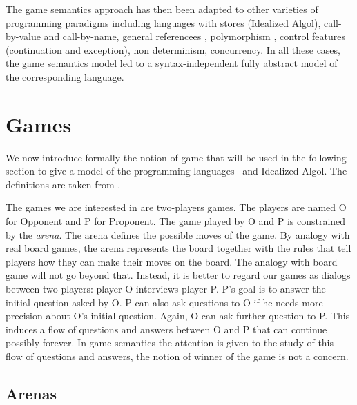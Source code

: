 The game semantics approach has then been adapted to other varieties
of programming paradigms including languages with stores (Idealized
Algol), call-by-value \citep{honda99gametheoretic,
abramsky98callbyvalue} and call-by-name, general referencees
\citep{DBLP:conf/lics/AbramskyHM98}, polymorphism
\citep{DBLP:journals/apal/AbramskyJ05}, control features
(continuation and exception), non determinism, concurrency. In all
these cases, the game semantics model led to a syntax-independent
fully abstract model of the corresponding language.

\section{Games}
\label{sec:catgames}

We now introduce formally the notion of game that will be used in
the following section to give a model of the programming languages
\pcf\ and Idealized Algol. The definitions are taken from
\cite{abramsky:game-semantics-tutorial, hylandong_pcf,
abramsky94full}.

The games we are interested in are two-players games. The players
are named O for Opponent and P for Proponent. The game played by O
and P is constrained by the \emph{arena}. The arena defines the
possible moves of the game. By analogy with real board games, the
arena represents the board together with the rules that tell players
how they can make their moves on the board. The analogy with board
game will not go beyond that. Instead, it is better to regard our
games as dialogs between two players: player O interviews player P.
P's goal is to answer the initial question asked by O. P can also
ask questions to O if he needs more precision about O's initial
question. Again, O can ask further question to P. This induces a
flow of questions and answers between O and P that can continue
possibly forever. In game semantics the attention is given to the
study of this flow of questions and answers, the notion of winner of
the game is not a concern.

\subsection{Arenas}


